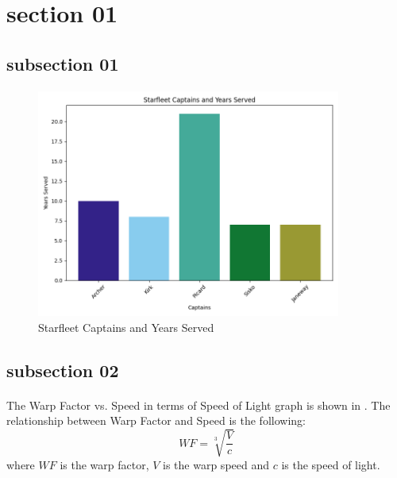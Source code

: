\documentclass[class=book, crop=false]{standalone}
\begin{document}
\section{section 01}
\subsection{subsection 01}

\paragraph*{}
\blindtext

\begin{figure}[htbp]
    \centering
    \includegraphics[width=10cm]{src/contents/figures_and_plots/plots/captains_and_years_served.png}
    \caption{Starfleet Captains and Years Served}
    \label{fig:captains}
\end{figure}

\paragraph*{}
\blindmathpaper\cite{knuth:1984}

\subsection{subsection 02}

\paragraph*{}
\blindtext
The Warp Factor vs. Speed in terms of Speed of Light graph is shown in . The relationship between Warp Factor and Speed is the following:
\begin{equation*}
    WF
    =
    \sqrt[3]{\frac{V}{c}}
\end{equation*}
where $WF$ is the warp factor, $V$ is the warp speed and $c$ is the speed of light.
\end{document}
